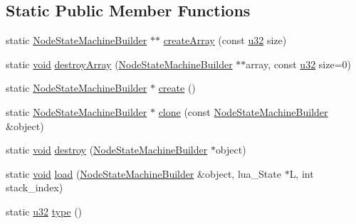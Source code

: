 \subsection*{Static Public Member Functions}
\begin{DoxyCompactItemize}
\item 
static \mbox{\hyperlink{classnjli_1_1_node_state_machine_builder}{Node\+State\+Machine\+Builder}} $\ast$$\ast$ \mbox{\hyperlink{classnjli_1_1_node_state_machine_builder_a87e85ebebdf78aa50dcc33397ee3274a}{create\+Array}} (const \mbox{\hyperlink{_util_8h_a10e94b422ef0c20dcdec20d31a1f5049}{u32}} size)
\item 
static \mbox{\hyperlink{_thread_8h_af1e856da2e658414cb2456cb6f7ebc66}{void}} \mbox{\hyperlink{classnjli_1_1_node_state_machine_builder_a71a0104d4850e419f9b06f3e6645475b}{destroy\+Array}} (\mbox{\hyperlink{classnjli_1_1_node_state_machine_builder}{Node\+State\+Machine\+Builder}} $\ast$$\ast$array, const \mbox{\hyperlink{_util_8h_a10e94b422ef0c20dcdec20d31a1f5049}{u32}} size=0)
\item 
static \mbox{\hyperlink{classnjli_1_1_node_state_machine_builder}{Node\+State\+Machine\+Builder}} $\ast$ \mbox{\hyperlink{classnjli_1_1_node_state_machine_builder_aea0b3e3e1d48675456383359f82ff9a1}{create}} ()
\item 
static \mbox{\hyperlink{classnjli_1_1_node_state_machine_builder}{Node\+State\+Machine\+Builder}} $\ast$ \mbox{\hyperlink{classnjli_1_1_node_state_machine_builder_ab5d5c3edf905469d7d5b5388bb06a27d}{clone}} (const \mbox{\hyperlink{classnjli_1_1_node_state_machine_builder}{Node\+State\+Machine\+Builder}} \&object)
\item 
static \mbox{\hyperlink{_thread_8h_af1e856da2e658414cb2456cb6f7ebc66}{void}} \mbox{\hyperlink{classnjli_1_1_node_state_machine_builder_aee8753fc57fd57568e1c5aff1e638fac}{destroy}} (\mbox{\hyperlink{classnjli_1_1_node_state_machine_builder}{Node\+State\+Machine\+Builder}} $\ast$object)
\item 
static \mbox{\hyperlink{_thread_8h_af1e856da2e658414cb2456cb6f7ebc66}{void}} \mbox{\hyperlink{classnjli_1_1_node_state_machine_builder_a3f31e9bbd1877b320c004d7d2dddcc93}{load}} (\mbox{\hyperlink{classnjli_1_1_node_state_machine_builder}{Node\+State\+Machine\+Builder}} \&object, lua\+\_\+\+State $\ast$L, int stack\+\_\+index)
\item 
static \mbox{\hyperlink{_util_8h_a10e94b422ef0c20dcdec20d31a1f5049}{u32}} \mbox{\hyperlink{classnjli_1_1_node_state_machine_builder_a167eb52c0f2a1816f9afaf9544e5f2da}{type}} ()
\end{DoxyCompactItemize}
